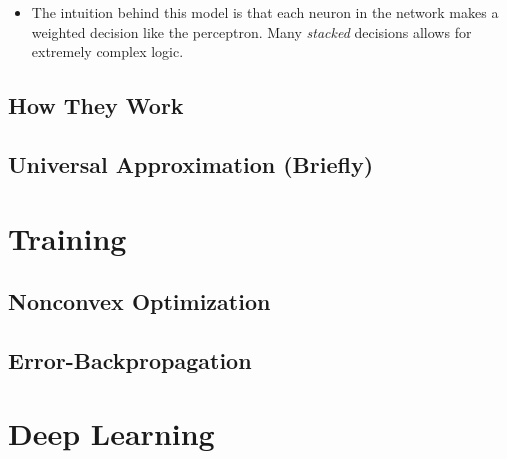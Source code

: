 \documentclass{beamer}
\begin{document}
\begin{frame}
\begin{itemize}
         \item The intuition behind this model is that each neuron in the network
         makes a weighted decision like the perceptron. Many \emph{stacked} decisions
         allows for extremely complex logic.
        \end{itemize}
    \end{frame}

    \subsection{How They Work} %



    \subsection{Universal Approximation (Briefly)}

\section{Training}

    \subsection{Nonconvex Optimization}
    \subsection{Error-Backpropagation}

\section{Deep Learning}


\end{document}
